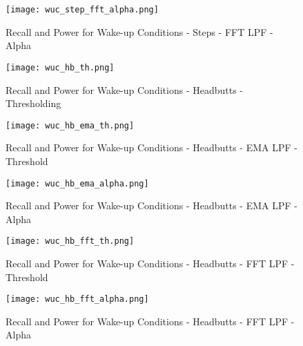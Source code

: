 \begin{figure}[p]
	\texttt{[image: wuc\_step\_fft\_alpha.png]}
	\caption{Recall and Power for Wake-up Conditions - Steps - FFT LPF - Alpha}
    	\label{fig:wucStepFftAlpha}
\end{figure}


\begin{figure}[p]
	\texttt{[image: wuc\_hb\_th.png]}
	\caption{Recall and Power for Wake-up Conditions - Headbutts - Thresholding}
    	\label{fig:wucHbTh}
\end{figure}


\begin{figure}[p]
	\texttt{[image: wuc\_hb\_ema\_th.png]}
	\caption{Recall and Power for Wake-up Conditions - Headbutts - EMA LPF - Threshold}
    	\label{fig:wucHbEmaTh}
\end{figure}


\begin{figure}[p]
	\texttt{[image: wuc\_hb\_ema\_alpha.png]}
	\caption{Recall and Power for Wake-up Conditions - Headbutts - EMA LPF - Alpha}
    	\label{fig:wucHbEmaAlpha}
\end{figure}


\begin{figure}[p]
	\texttt{[image: wuc\_hb\_fft\_th.png]}
	\caption{Recall and Power for Wake-up Conditions - Headbutts - FFT LPF - Threshold}
    	\label{fig:wucHbFftTh}
\end{figure}


\begin{figure}[p]
	\texttt{[image: wuc\_hb\_fft\_alpha.png]}
	\caption{Recall and Power for Wake-up Conditions - Headbutts - FFT LPF - Alpha}
    	\label{fig:wucHbFftAlpha}
\end{figure}

